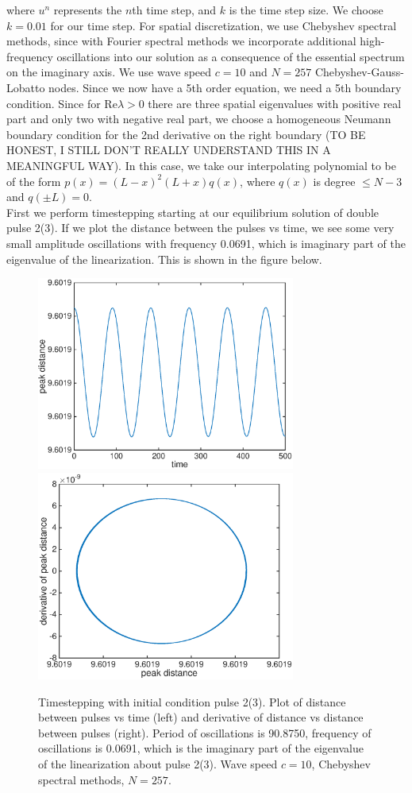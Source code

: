 \documentclass[12pt]{article}
\begin{document}
where $u^n$ represents the $n$th time step, and $k$ is the time step size. We choose $k = 0.01$ for our time step. For spatial discretization, we use Chebyshev spectral methods, since with Fourier spectral methods we incorporate additional high-frequency oscillations into our solution as a consequence of the essential spectrum on the imaginary axis. We use wave speed $c = 10$ and $N = 257$ Chebyshev-Gauss-Lobatto nodes. Since we now have a 5th order equation, we need a 5th boundary condition. Since for $\textrm{Re} \lambda > 0$ there are three spatial eigenvalues with positive real part and only two with negative real part, we choose a homogeneous Neumann boundary condition for the 2nd derivative on the right boundary (TO BE HONEST, I STILL DON'T REALLY UNDERSTAND THIS IN A MEANINGFUL WAY). In this case, we take our interpolating polynomial to be of the form $p(x) = (L-x)^2 (L+x) q(x)$, where $q(x)$ is degree $\leq N-3$ and $q(\pm L) = 0$. \\

First we perform timestepping starting at our equilibrium solution of double pulse 2(3). If we plot the distance between the pulses vs time, we see some very small amplitude oscillations with frequency 0.0691, which is imaginary part of the eigenvalue of the linearization. This is shown in the figure below.

\begin{figure}[H]
	\includegraphics[width=8.5cm]{cheb10dist2_0}
	\includegraphics[width=8.5cm]{cheb10deriv2_0}
	\caption{Timestepping with initial condition pulse 2(3). Plot of distance between pulses vs time (left) and derivative of distance vs distance between pulses (right). Period of oscillations is 90.8750, frequency of oscillations is 0.0691, which is the imaginary part of the eigenvalue of the linearization about pulse 2(3). Wave speed $c = 10$, Chebyshev spectral methods, $N = 257$.}
\end{figure}
\end{document}
